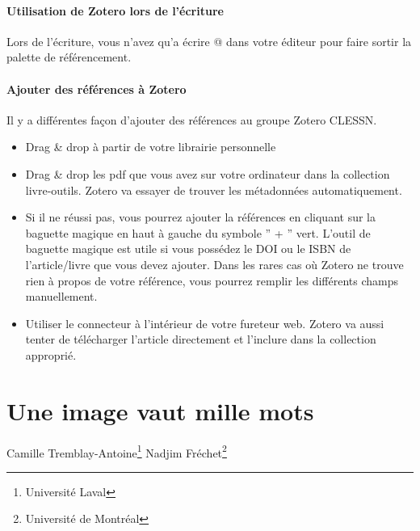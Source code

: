 \documentclass[
  letterpaper,
]{scrbook}
\providecommand{\tightlist}{%
  \setlength{\itemsep}{0pt}\setlength{\parskip}{0pt}}\usepackage{longtable,booktabs,array}
\begin{document}
\hypertarget{utilisation-de-zotero-lors-de-luxe9criture}{%
\subsubsection{Utilisation de Zotero lors de
l'écriture}\label{utilisation-de-zotero-lors-de-luxe9criture}}

Lors de l'écriture, vous n'avez qu'a écrire @ dans votre éditeur pour
faire sortir la palette de référencement.

\hypertarget{ajouter-des-ruxe9fuxe9rences-uxe0-zotero}{%
\subsubsection{Ajouter des références à
Zotero}\label{ajouter-des-ruxe9fuxe9rences-uxe0-zotero}}

Il y a différentes façon d'ajouter des références au groupe Zotero
CLESSN.

\begin{itemize}
\tightlist
\item
  Drag \& drop à partir de votre librairie personnelle
\item
  Drag \& drop les pdf que vous avez sur votre ordinateur dans la
  collection livre-outils. Zotero va essayer de trouver les métadonnées
  automatiquement.
\item
  Si il ne réussi pas, vous pourrez ajouter la références en cliquant
  sur la baguette magique en haut à gauche du symbole '' + '' vert.
  L'outil de baguette magique est utile si vous possédez le DOI ou le
  ISBN de l'article/livre que vous devez ajouter. Dans les rares cas où
  Zotero ne trouve rien à propos de votre référence, vous pourrez
  remplir les différents champs manuellement.
\item
  Utiliser le connecteur à l'intérieur de votre fureteur web. Zotero va
  aussi tenter de télécharger l'article directement et l'inclure dans la
  collection approprié.
\end{itemize}


\hypertarget{une-image-vaut-mille-mots}{%
\chapter{Une image vaut mille mots}\label{une-image-vaut-mille-mots}}

Camille Tremblay-Antoine\footnote{Université Laval} Nadjim
Fréchet\footnote{Université de Montréal}
\end{document}
